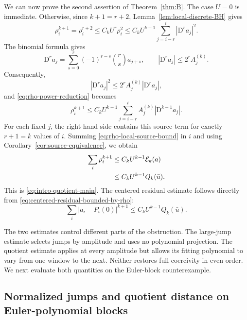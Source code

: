 \documentclass[11pt]{amsart}
\theoremstyle{plain}
\theoremstyle{definition}
\theoremstyle{remark}
\numberwithin{equation}{section}
\theoremstyle{plain}
\begin{document}
We can now prove the second assertion of Theorem~\ref{thm:B}.  The case
$U=0$ is immediate.  Otherwise, since $k+1=r+2$,
Lemma~\ref{lem:local-discrete-BH} gives
\begin{equation}\label{eq:rho-power-reduction}
	\rho_i^{k+1}
	=\rho_i^{r+2}
	\le C_kU^r\rho_i^2
	\le C_kU^{k-1}
	\sum_{j=i-r}^{i}|\mathrm D^ra_j|^2.
\end{equation}
The binomial formula gives
\begin{equation}\label{eq:difference-amplitude-bound-section5}
	\mathrm D^ra_j
	=\sum_{s=0}^{r}(-1)^{r-s}\binom rs a_{j+s},
	\qquad
	|\mathrm D^ra_j|\le2^rA_j^{(k)}.
\end{equation}
Consequently,
\begin{equation}\label{eq:difference-square-source-bound}
	|\mathrm D^ra_j|^2
	\le2^rA_j^{(k)}|\mathrm D^ra_j|,
\end{equation}
and \eqref{eq:rho-power-reduction} becomes
\begin{equation}\label{eq:rho-local-source-bound}
	\rho_i^{k+1}
	\le C_kU^{k-1}
	\sum_{j=i-r}^{i}
	A_j^{(k)}|\mathrm D^{k-1}a_j|.
\end{equation}
For each fixed $j$, the right-hand side contains this source term for exactly
$r+1=k$ values of $i$.  Summing \eqref{eq:rho-local-source-bound} in $i$
and using Corollary~\ref{cor:source-equivalence}, we obtain
\begin{align}
	\sum_i\rho_i^{k+1}
	&\le C_kU^{k-1}\mathcal E_k(a)
	\notag\\
	&\le C_kU^{k-1}Q_k(\bar u).
	\label{eq:quotient-coercivity-section5}
\end{align}
This is \eqref{eq:intro-quotient-main}.  The centered residual estimate
follows directly from
\eqref{eq:centered-residual-bounded-by-rho}:
\begin{equation}\label{eq:centered-residual-coercivity}
	\sum_i|a_i-P_i(0)|^{k+1}
	\le C_kU^{k-1}Q_k(\bar u).
\end{equation}

The two estimates control different parts of the obstruction.
The large-jump estimate selects jumps by amplitude and uses no polynomial
projection.  The
quotient estimate applies at every amplitude but allows its fitting polynomial
to vary from one window to the next.  Neither restores full coercivity in even
order.  We next evaluate both quantities on the Euler-block counterexample.

\subsection{Normalized jumps and quotient distance on Euler-polynomial blocks}
\label{sec:euler-replacement-quantities}
\end{document}
